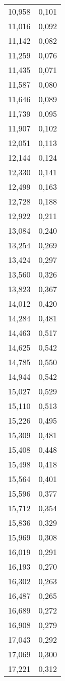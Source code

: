 \begin{longtable}{c c}
	10,958&0,101 \\
	11,016&0,092 \\
	11,142&0,082 \\
	11,259&0,076 \\
	11,435&0,071 \\
	11,587&0,080 \\
	11,646&0,089 \\
	11,739&0,095 \\
	11,907&0,102 \\
	12,051&0,113 \\
	12,144&0,124 \\
	12,330&0,141 \\
	12,499&0,163 \\
	12,728&0,188 \\
	12,922&0,211 \\
	13,084&0,240 \\
	13,254&0,269 \\
	13,424&0,297 \\
	13,560&0,326 \\
	13,823&0,367 \\
	14,012&0,420 \\
	14,284&0,481 \\
	14,463&0,517 \\
	14,625&0,542 \\
	14,785&0,550 \\
	14,944&0,542 \\
	15,027&0,529 \\
	15,110&0,513 \\
	15,226&0,495 \\
	15,309&0,481 \\
	15,408&0,448 \\
	15,498&0,418 \\
	15,564&0,401 \\
	15,596&0,377 \\
	15,712&0,354 \\
	15,836&0,329 \\
	15,969&0,308 \\
	16,019&0,291 \\
	16,193&0,270 \\
	16,302&0,263 \\
	16,487&0,265 \\
	16,689&0,272 \\
	16,908&0,279 \\
	17,043&0,292 \\
	17,069&0,300 \\
	17,221&0,312 \\

\end{longtable}
